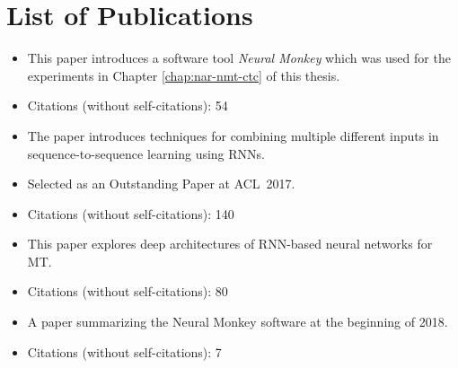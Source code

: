 \chapter*{List of Publications}




\noindent{}
\begin{itemize}[noitemsep,topsep=0pt]

\item This paper introduces a software tool \emph{Neural Monkey} which was used
  for the experiments in Chapter \ref{chap:nar-nmt-ctc} of this thesis.

\item Citations (without self-citations): 54
\end{itemize}\vspace{3mm}

\noindent{}
\begin{itemize}[noitemsep,topsep=0pt]

\item The paper introduces techniques for combining multiple different inputs
  in sequence-to-sequence learning using RNNs.
\item Selected as an Outstanding Paper at ACL~2017.

\item Citations (without self-citations): 140
\end{itemize}\vspace{3mm}

\noindent{}
\begin{itemize}[noitemsep,topsep=0pt]

\item This paper explores deep architectures of RNN-based neural networks for
  MT.

\item Citations (without self-citations): 80
\end{itemize}

\noindent{}
\begin{itemize}[noitemsep,topsep=0pt]

\item A paper summarizing the Neural Monkey software at the beginning of 2018.

\item Citations (without self-citations): 7
\end{itemize}\vspace{3mm}

